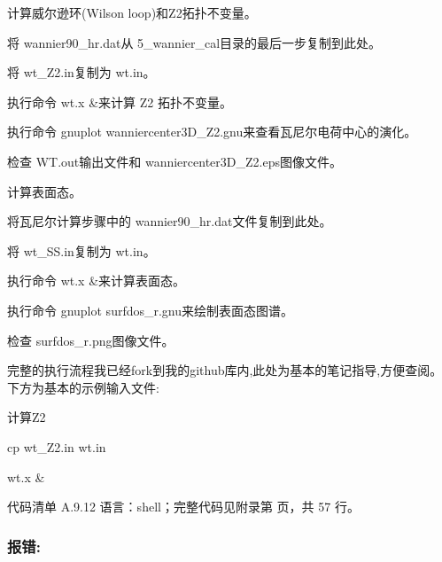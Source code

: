 \documentclass[lang=cn,scheme=chinese,color=blue,device=normal,toc=onecol,math=cm]{elegantbook}
\begin{document}
计算威尔逊环(Wilson loop)和Z2拓扑不变量。\par


将 wannier90\_\allowbreak{}hr.dat从 5\_\allowbreak{}wannier\_\allowbreak{}cal目录的最后一步复制到此处。\par


将 wt\_\allowbreak{}Z2.in复制为 wt.in。\par


执行命令 wt.x \&来计算 Z2 拓扑不变量。\par


执行命令 gnuplot wanniercenter3D\_\allowbreak{}Z2.gnu来查看瓦尼尔电荷中心的演化。\par


检查 WT.out输出文件和 wanniercenter3D\_\allowbreak{}Z2.eps图像文件。\par


计算表面态。\par


将瓦尼尔计算步骤中的 wannier90\_\allowbreak{}hr.dat文件复制到此处。\par


将 wt\_\allowbreak{}SS.in复制为 wt.in。\par


执行命令 wt.x \&来计算表面态。\par


执行命令 gnuplot surfdos\_\allowbreak{}r.gnu来绘制表面态图谱。\par


检查 surfdos\_\allowbreak{}r.png图像文件。\par


完整的执行流程我已经fork到我的github库内,此处为基本的笔记指导,方便查阅。下方为基本的示例输入文件:\par


计算Z2\par


cp wt\_\allowbreak{}Z2.in wt.in\par


wt.x \&\par


\begin{codeindexbox}{代码清单 A.9.12}
语言：shell；完整代码见附录第 \pageref{code:9:12} 页，共 57 行。
\end{codeindexbox}


\subsubsection{报错:}
\end{document}
